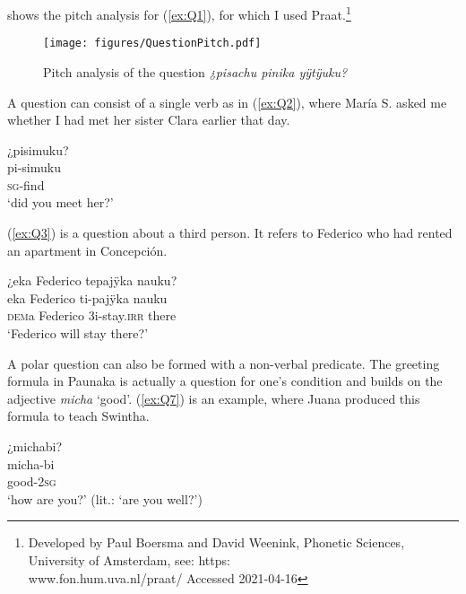  shows the pitch analysis for (\ref{ex:Q1}), for which I used Praat.\footnote{Developed by Paul Boersma and David Weenink, Phonetic Sciences, University of Amsterdam, see: https:\\www.fon.hum.uva.nl/praat/ Accessed 2021-04-16}

\begin{figure}

\texttt{[image: figures/QuestionPitch.pdf]}
\caption{Pitch analysis of the question \textit{¿pisachu pinika yÿtÿuku?}}
\label{fig:pitch-Q}

\end{figure}


A question can consist of a single verb as in (\ref{ex:Q2}), where María S. asked me whether I had met her sister Clara earlier that day.

\ea\label{ex:Q2}
\begingl
\glpreamble ¿pisimuku?\\
\gla pi-simuku\\
\textsc{sg}-find\\
\glft ‘did you meet her?’
\endgl
\trailingcitation{[rxx-e120511l.083]}
\xe


(\ref{ex:Q3}) is a question about a third person. It refers to Federico who had rented an apartment in Concepción.

\ea\label{ex:Q3}
\begingl
\glpreamble ¿eka Federico tepajÿka nauku?\\
\gla eka Federico ti-pajÿka nauku\\
\glb \textsc{dem}a Federico 3i-stay.\textsc{irr} there\\
\glft ‘Federico will stay there?’
\endgl
\trailingcitation{[jxx-p110923l-1.089]}
\xe

A polar question can also be formed with a non-verbal predicate. The greeting formula in Paunaka is actually a question for one’s condition and builds on the adjective \textit{micha} ‘good’. (\ref{ex:Q7}) is an example, where Juana produced this formula to teach Swintha.

\ea\label{ex:Q7}
\begingl
\glpreamble ¿michabi?\\
\gla micha-bi\\
\glb good-2\textsc{sg}\\
\glft ‘how are you?’ (lit.: ‘are you well?’)
\endgl
\trailingcitation{[jxx-n101013s-1.081]}
\xe

